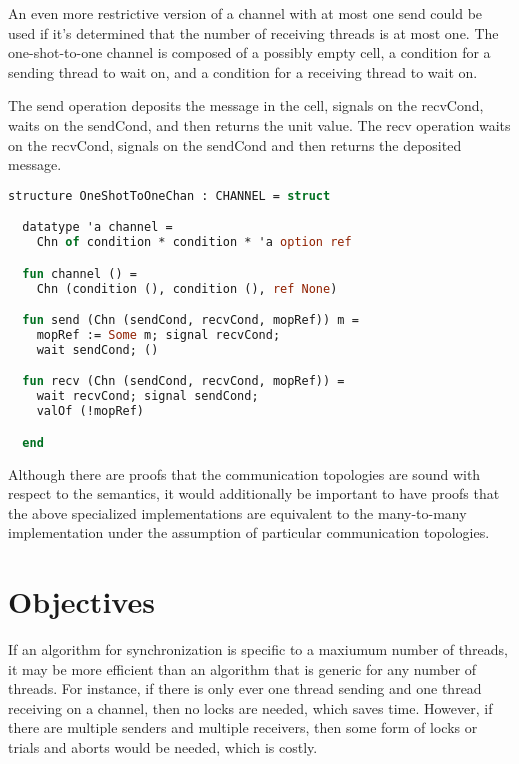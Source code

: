 \documentclass{article}
\begin{document}
An even more restrictive version of a channel with at most one send could be used if it's
determined that the number of receiving threads is at most one.  The one-shot-to-one channel is
composed of a possibly empty cell, a condition for a sending thread to wait on, and a condition
for a receiving thread to wait on.

The send operation deposits the message in the cell, signals on the recvCond, waits on the
sendCond, and then returns the unit value.  The recv operation waits on the recvCond, signals
on the sendCond and then returns the deposited message.


\begin{lstlisting}[language=ML, style=codestyle1, escapechar=\%]
structure OneShotToOneChan : CHANNEL = struct

  datatype 'a channel =
    Chn of condition * condition * 'a option ref

  fun channel () =
    Chn (condition (), condition (), ref None)

  fun send (Chn (sendCond, recvCond, mopRef)) m =
    mopRef := Some m; signal recvCond;  
    wait sendCond; ()

  fun recv (Chn (sendCond, recvCond, mopRef)) =
    wait recvCond; signal sendCond;
    valOf (!mopRef)

  end
  \end{lstlisting}



Although there are proofs that the communication topologies are sound with respect to the
semantics, it would additionally be important to have proofs that the above specialized
implementations are equivalent to the many-to-many implementation under the assumption of
particular communication topologies.


\section{Objectives}
If an algorithm for synchronization is specific to a maxiumum number of threads, it may be more
efficient than an algorithm that is generic for any number of threads.  For instance, if there
is only ever one thread sending and one thread receiving on a channel, then no locks are
needed, which saves time.  However, if there are multiple senders and multiple receivers, then
some form of locks or trials and aborts would be needed, which is costly.
\end{document}
